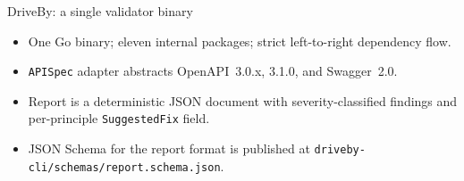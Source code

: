 \documentclass[10pt,aspectratio=169]{beamer}
\begin{document}
\begin{frame}{DriveBy: a single validator binary}

\begin{center}
\end{center}

\vspace{0.7em}
\footnotesize
\begin{itemize}\setlength\itemsep{0.3em}
\item One Go binary; eleven internal packages; strict left-to-right
  dependency flow.
\item \texttt{APISpec} adapter abstracts OpenAPI~3.0.x, 3.1.0, and
  Swagger~2.0.
\item Report is a deterministic JSON document with severity-classified
  findings and per-principle \texttt{SuggestedFix} field.
\item JSON Schema for the report format is published at
  \texttt{driveby-cli/schemas/report.schema.json}.
\end{itemize}

\end{frame}
\end{document}

